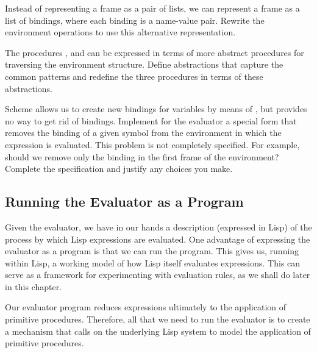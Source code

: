 \begin{exercise}
	\label{Exercise 4.11}
	Instead of representing a frame as a pair of lists, we can represent a frame as a list of bindings, where each binding is a name-value pair.
	Rewrite the environment operations to use this alternative representation.
\end{exercise}



\begin{exercise}
	\label{Exercise 4.12}
	The procedures ,  and  can be expressed in terms of more abstract procedures for traversing the environment structure.
	Define abstractions that capture the common patterns and redefine the three procedures in terms of these abstractions.
\end{exercise}



\begin{exercise}
	\label{Exercise 4.13}
	Scheme allows us to create new bindings for variables by means of , but provides no way to get rid of bindings.
	Implement for the evaluator a special form  that removes the binding of a given symbol from the environment in which the  expression is evaluated.
	This problem is not completely specified.
	For example, should we remove only the binding in the first frame of the environment?
	Complete the specification and justify any choices you make.
\end{exercise}



\subsection{Running the Evaluator as a Program}
\label{Section 4.1.4}

Given the evaluator, we have in our hands a description (expressed in Lisp) of the process by which Lisp expressions are evaluated.
One advantage of expressing the evaluator as a program is that we can run the program.
This gives us, running within Lisp, a working model of how Lisp itself evaluates expressions.
This can serve as a framework for experimenting with evaluation rules, as we shall do later in this chapter.

Our evaluator program reduces expressions ultimately to the application of primitive procedures.
Therefore, all that we need to run the evaluator is to create a mechanism that calls on the underlying Lisp system to model the application of primitive procedures.

